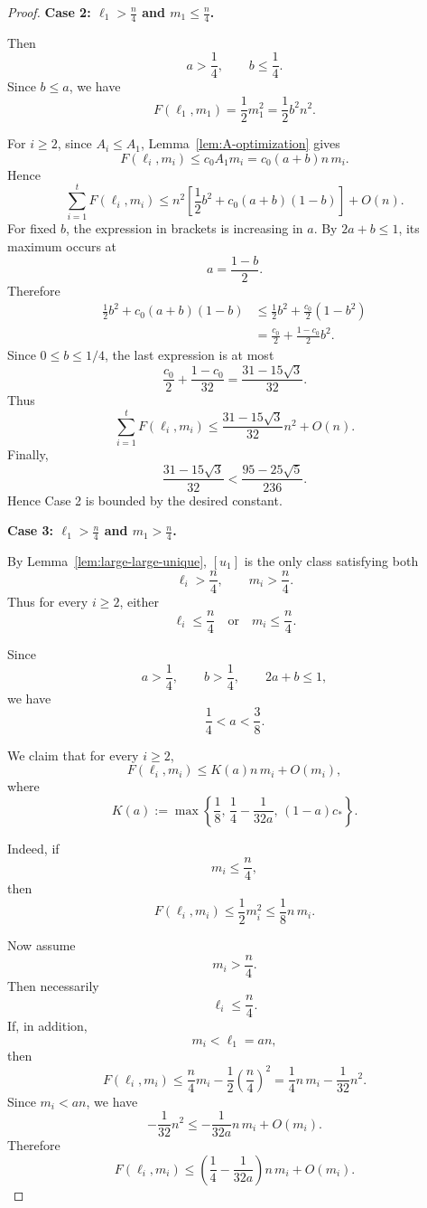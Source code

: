 \documentclass[runningheads,envcountsame,a4paper]{llncs}
\begin{document}
\begin{proof}
\medskip

\noindent
\textbf{Case 2: \(\ell_1>\frac n4\) and \(m_1\le\frac n4\).}

Then
\[
        a>\frac14,
        \qquad
        b\le\frac14.
\]
Since \(b\le a\), we have
\[
        F(\ell_1,m_1)=\frac12m_1^2=\frac12b^2n^2.
\]

For \(i\ge2\), since \(A_i\le A_1\), Lemma~\ref{lem:A-optimization} gives
\[
        F(\ell_i,m_i)\le c_0A_1m_i
        =
        c_0(a+b)n\,m_i.
\]
Hence
\[
        \sum_{i=1}^tF(\ell_i,m_i)
        \le
        n^2\left[
        \frac12b^2+c_0(a+b)(1-b)
        \right]+O(n).
\]
For fixed \(b\), the expression in brackets is increasing in \(a\). By
\(2a+b\le1\), its maximum occurs at
\[
        a=\frac{1-b}{2}.
\]
Therefore
\[
\begin{aligned}
        \frac12b^2+c_0(a+b)(1-b)
        &\le
        \frac12b^2+\frac{c_0}{2}(1-b^2)\\
        &=
        \frac{c_0}{2}+\frac{1-c_0}{2}b^2.
\end{aligned}
\]
Since \(0\le b\le1/4\), the last expression is at most
\[
        \frac{c_0}{2}+\frac{1-c_0}{32}
        =
        \frac{31-15\sqrt3}{32}.
\]
Thus
\[
        \sum_{i=1}^tF(\ell_i,m_i)
        \le
        \frac{31-15\sqrt3}{32}n^2+O(n).
\]
Finally,
\[
        \frac{31-15\sqrt3}{32}
        <
        \frac{95-25\sqrt5}{236}.
\]
Hence Case 2 is bounded by the desired constant.

\medskip

\noindent
\textbf{Case 3: \(\ell_1>\frac n4\) and \(m_1>\frac n4\).}

By Lemma~\ref{lem:large-large-unique}, \([u_1]\) is the only class satisfying
both
\[
        \ell_i>\frac n4,
        \qquad
        m_i>\frac n4.
\]
Thus for every \(i\ge2\), either
\[
        \ell_i\le\frac n4
        \quad\text{or}\quad
        m_i\le\frac n4.
\]

Since
\[
        a>\frac14,
        \qquad
        b>\frac14,
        \qquad
        2a+b\le1,
\]
we have
\[
        \frac14<a<\frac38.
\]

We claim that for every \(i\ge2\),
\[
        F(\ell_i,m_i)\le K(a)n\,m_i+O(m_i),
\]
where
\[
K(a):=
\max\left\{
        \frac18,\,
        \frac14-\frac{1}{32a},\,
        (1-a)c_*
\right\}.
\]

Indeed, if
\[
        m_i\le\frac n4,
\]
then
\[
        F(\ell_i,m_i)\le \frac12m_i^2\le \frac18n\,m_i.
\]

Now assume
\[
        m_i>\frac n4.
\]
Then necessarily
\[
        \ell_i\le\frac n4.
\]
If, in addition,
\[
        m_i<\ell_1=an,
\]
then
\[
        F(\ell_i,m_i)
        \le
        \frac n4m_i-\frac12\left(\frac n4\right)^2
        =
        \frac14n\,m_i-\frac1{32}n^2.
\]
Since \(m_i<an\), we have
\[
        -\frac1{32}n^2
        \le
        -\frac{1}{32a}n\,m_i+O(m_i).
\]
Therefore
\[
        F(\ell_i,m_i)
        \le
        \left(\frac14-\frac{1}{32a}\right)n\,m_i+O(m_i).
\]


\end{proof}
\end{document}

